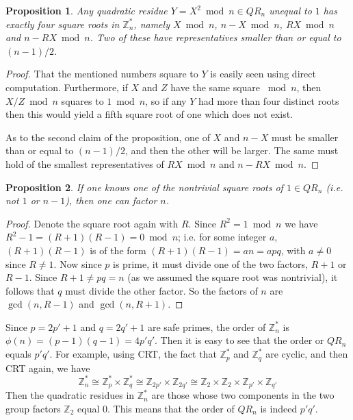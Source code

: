 \documentclass[a4paper,12pt]{article}
\newtheorem{proposition}{Proposition}
\newcommand{\Z}{\mathbb{Z}}
\begin{document}
\begin{proposition}
Any quadratic residue $Y = X^2 \bmod n \in QR_n$ unequal to $1$ has exactly four square roots in $\Z^*_n$, namely $X \bmod n$, $n-X \bmod n$, $RX \bmod n$ and $n-RX \bmod n$. Two of these have representatives smaller than or equal to $(n-1)/2$.
\end{proposition}

\begin{proof}
That the mentioned numbers square to $Y$ is easily seen using direct computation. Furthermore, if $X$ and $Z$ have the same square ${}\bmod n$, then $X/Z \bmod n$ squares to $1 \bmod n$, so if any $Y$ had more than four distinct roots then this would yield a fifth square root of one which does not exist.

As to the second claim of the proposition, one of $X$ and $n-X$ must be smaller than or equal to $(n-1)/2$, and then the other will be larger. The same must hold of the smallest representatives of $RX \bmod n$ and $n-RX \bmod n$.
\end{proof}

\begin{proposition}
If one knows one of the nontrivial square roots of $1 \in QR_n$ (i.e. not $1$ or $n-1$), then one can factor $n$.
\end{proposition}

\begin{proof}
Denote the square root again with $R$. Since $R^2 = 1 \bmod n$ we have $R^2 - 1 = (R+1)(R-1) = 0 \bmod n$; i.e. for some integer $a$, $(R+1)(R-1)$ is of the form $(R+1)(R-1) = an = apq$, with $a \neq 0$ since $R \neq 1$. Now since $p$ is prime, it must divide one of the two factors, $R+1$ or $R-1$. Since $R+1 \neq pq = n$ (as we assumed the square root was nontrivial), it follows that $q$ must divide the other factor. So the factors of $n$ are $\gcd(n, R-1)$ and $\gcd(n, R+1)$.
\end{proof}

\noindent Since $p = 2p'+1$ and $q = 2q'+1$ are safe primes, the order of $\Z^*_n$ is $\phi(n) = (p-1)(q-1) = 4p'q'$. Then it is easy to see that the order or $QR_n$ equals $p'q'$. For example, using CRT, the fact that $\Z^*_p$ and $\Z^*_q$ are cyclic, and then CRT again, we have
\[
  \Z^*_n \cong \Z^*_p \times \Z^*_q \cong \Z_{2p'} \times \Z_{2q'} \cong \Z_2 \times \Z_2 \times \Z_{p'} \times \Z_{q'}
\]
Then the quadratic residues in $\Z^*_n$ are those whose two components in the two group factors $\Z_2$ equal $0$. This means that the order of $QR_n$ is indeed $p'q'$.
\end{document}
